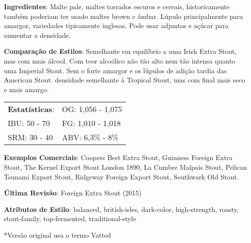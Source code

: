 \textbf{Ingredientes}: Malte pale, maltes torrados escuros e cereais, historicamente também poderiam ter usado maltes brown e âmbar. Lúpulo principalmente para amargor, variedades tipicamente inglesas. Pode usar adjuntos e açúcar para aumentar a densidade.

\textbf{Comparação de Estilos}: Semelhante em equilíbrio a uma Irish Extra Stout, mas com mais álcool. Com teor alcoólico não tão alto nem tão intensa quanto uma Imperial Stout. Sem o forte amargor e os lúpulos de adição tardia das American Stout. densidade semelhante à Tropical Stout, mas com final mais seco e mais amargo.

\begin{tabular}{@{}p{35mm}p{35mm}@{}}
  \textbf{Estatísticas}: & OG: 1,056 - 1,075 \\
  IBU: 50 - 70  & FG: 1,010 - 1,018  \\
  SRM: 30 - 40   & ABV: 6,3\% - 8\%
\end{tabular}

\textbf{Exemplos Comerciais}: Coopers Best Extra Stout, Guinness Foreign Extra Stout, The Kernel Export Stout London 1890, La Cumbre Malpais Stout, Pelican Tsunami Export Stout, Ridgeway Foreign Export Stout, Southwark Old Stout.

\textbf{Última Revisão}: Foreign Extra Stout (2015)

\textbf{Atributos de Estilo}: balanced, british-isles, dark-color, high-strength, roasty, stout-family, top-fermented, traditional-style

*Versão original usa o termo Vatted
